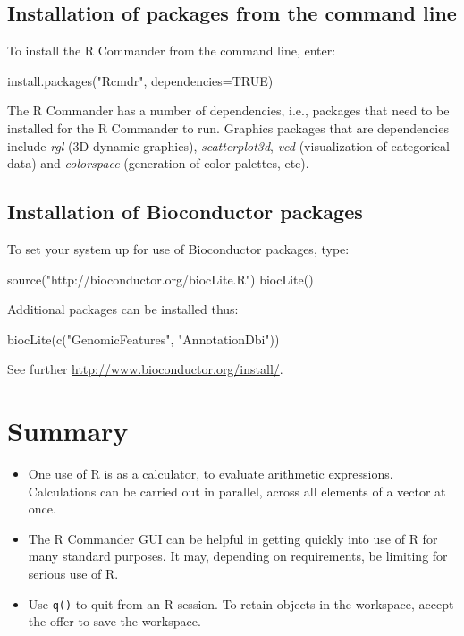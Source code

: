 \documentclass{tufte-book}\usepackage[]{graphicx}\usepackage[]{color}
\newcommand{\txtt}[1]{\texttt{#1}}
\newenvironment{itemizz}%
  {\begin{itemize} %
    \setlength{\itemsep}{2pt}%
    \setlength{\parskip}{2pt}} %
  {\end{itemize}}
\begin{document}
\subsection*{Installation of packages from the command line}

To install the R Commander from the command line, enter:
\begin{Schunk}
\begin{Sinput}
install.packages("Rcmdr", dependencies=TRUE)
\end{Sinput}
\end{Schunk}
The R Commander has a number of dependencies, i.e., packages that
need to be installed for the R Commander to run.  Graphics packages
that are dependencies include \textit{rgl} (3D dynamic graphics),
\textit{scatterplot3d}, \textit{vcd} (visualization of categorical
data) and \textit{colorspace} (generation of color palettes, etc).

\subsection*{Installation of Bioconductor packages}
  To set your system up for use of
Bioconductor packages, type:
\begin{Schunk}
\begin{Sinput}
source("http://bioconductor.org/biocLite.R")
biocLite()
\end{Sinput}
\end{Schunk}
Additional packages can be installed thus:
\begin{Schunk}
\begin{Sinput}
biocLite(c("GenomicFeatures", "AnnotationDbi"))
\end{Sinput}
\end{Schunk}
See further \url{http://www.bioconductor.org/install/}.

\section{Summary}
\begin{itemizz}
\item[] One use of R is as a calculator, to evaluate arithmetic
expressions. Calculations can be carried out in parallel, across all
elements of a vector at once.

\item[] The R Commander GUI can be helpful in getting quickly into use
  of R for many standard purposes.  It may, depending on requirements,
  be limiting for serious use of R.

\item[] Use \txtt{q()} to quit from an R session. To retain objects in
  the workspace, accept the offer to save the workspace.
\end{itemizz}
\end{document}
